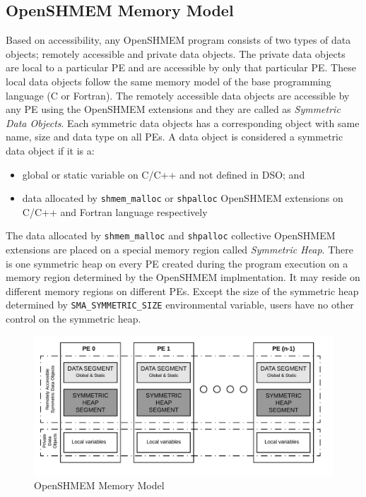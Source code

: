 \subsection{OpenSHMEM Memory Model}
\label{src:bg/mmodel}
Based on accessibility, any OpenSHMEM program consists of two types of data
objects; remotely accessible and private data objects. The private data objects
are local to a particular PE and are accessible by only that particular PE.
These local data objects follow the same memory model of the base programming
language (C or Fortran). The remotely accessible data objects are accessible
by any PE using the OpenSHMEM extensions and they are called as \emph{Symmetric
Data Objects}. Each symmetric data objects has a corresponding object with same
name, size and data type on all PEs. A data object is considered a symmetric
data object if it is a:
\begin{itemize}
    \item global or static variable on C/C++ and not defined in DSO; and
    \item data allocated by \texttt{shmem\_malloc} or \texttt{shpalloc}
    OpenSHMEM extensions on C/C++ and Fortran language respectively
\end{itemize}

The data allocated by \texttt{shmem\_malloc} and \texttt{shpalloc} collective
OpenSHMEM extensions are placed on a special memory region called \emph{Symmetric
Heap}. There is one symmetric heap on every PE created during the program execution
on a memory region determined by the OpenSHMEM implmentation. It may reside on
different memory regions on different PEs. Except the size of the symmetric heap
determined by \texttt{SMA\_SYMMETRIC\_SIZE} environmental variable, users have no
other control on the symmetric heap.

\begin{figure}[!h]
    \vspace{-20pt}
    \hspace*{5mm}
    \includegraphics[scale=0.20]{image/osm-mmodel.png}
    \vspace{-25pt}
    \caption{OpenSHMEM Memory Model}
    \label{fig:mmodel}
\end{figure}

